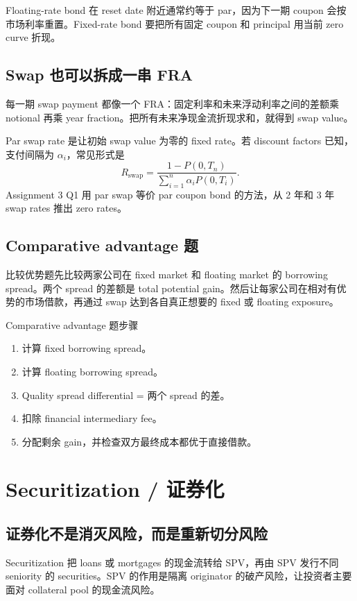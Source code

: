 Floating-rate bond 在 reset date 附近通常约等于 par，因为下一期 coupon 会按市场利率重置。Fixed-rate bond 要把所有固定 coupon 和 principal 用当前 zero curve 折现。

\subsection{Swap 也可以拆成一串 FRA}
每一期 swap payment 都像一个 FRA：固定利率和未来浮动利率之间的差额乘 notional 再乘 year fraction。把所有未来净现金流折现求和，就得到 swap value。

Par swap rate 是让初始 swap value 为零的 fixed rate。若 discount factors 已知，支付间隔为 $\alpha_i$，常见形式是
\[
R_{\text{swap}}=\frac{1-P(0,T_n)}{\sum_{i=1}^{n}\alpha_iP(0,T_i)}.
\]
Assignment 3 Q1 用 par swap 等价 par coupon bond 的方法，从 2 年和 3 年 swap rates 推出 zero rates。

\subsection{Comparative advantage 题}
比较优势题先比较两家公司在 fixed market 和 floating market 的 borrowing spread。两个 spread 的差额是 total potential gain。然后让每家公司在相对有优势的市场借款，再通过 swap 达到各自真正想要的 fixed 或 floating exposure。

\begin{workflowbox}{Comparative advantage 题步骤}
\begin{enumerate}
  \item 计算 fixed borrowing spread。
  \item 计算 floating borrowing spread。
  \item Quality spread differential = 两个 spread 的差。
  \item 扣除 financial intermediary fee。
  \item 分配剩余 gain，并检查双方最终成本都优于直接借款。
\end{enumerate}
\end{workflowbox}

\section{Securitization / 证券化}

\subsection{证券化不是消灭风险，而是重新切分风险}
Securitization 把 loans 或 mortgages 的现金流转给 SPV，再由 SPV 发行不同 seniority 的 securities。SPV 的作用是隔离 originator 的破产风险，让投资者主要面对 collateral pool 的现金流风险。


